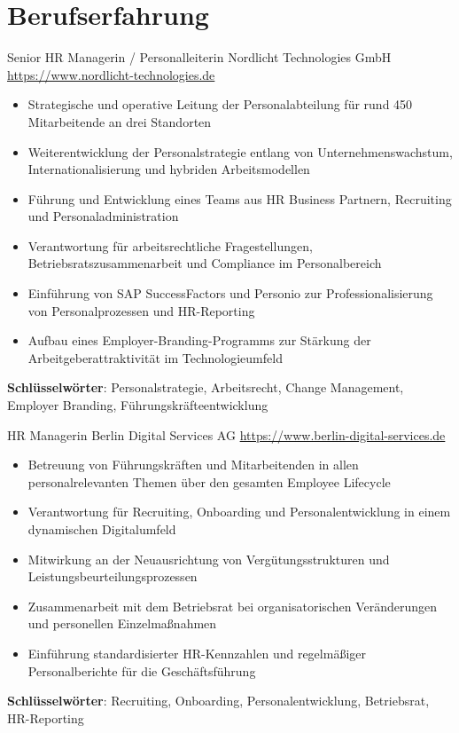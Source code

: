\documentclass[a4paper, serif, 10pt]{moderncv}
\begin{document}
\section{Berufserfahrung}

        {Senior HR Managerin / Personalleiterin}
        {Nordlicht Technologies GmbH}
        {\url{https://www.nordlicht-technologies.de}}
        {}
        {\begin{itemize}
\item Strategische und operative Leitung der Personalabteilung für rund 450 Mitarbeitende an drei Standorten
\item Weiterentwicklung der Personalstrategie entlang von Unternehmenswachstum, Internationalisierung und hybriden Arbeitsmodellen
\item Führung und Entwicklung eines Teams aus HR Business Partnern, Recruiting und Personaladministration
\item Verantwortung für arbeitsrechtliche Fragestellungen, Betriebsratszusammenarbeit und Compliance im Personalbereich
\item Einführung von SAP SuccessFactors und Personio zur Professionalisierung von Personalprozessen und HR-Reporting
\item Aufbau eines Employer-Branding-Programms zur Stärkung der Arbeitgeberattraktivität im Technologieumfeld
\end{itemize}
\textbf{Schlüsselwörter}: Personalstrategie, Arbeitsrecht, Change Management, Employer Branding, Führungskräfteentwicklung}

        {HR Managerin}
        {Berlin Digital Services AG}
        {\url{https://www.berlin-digital-services.de}}
        {}
        {\begin{itemize}
\item Betreuung von Führungskräften und Mitarbeitenden in allen personalrelevanten Themen über den gesamten Employee Lifecycle
\item Verantwortung für Recruiting, Onboarding und Personalentwicklung in einem dynamischen Digitalumfeld
\item Mitwirkung an der Neuausrichtung von Vergütungsstrukturen und Leistungsbeurteilungsprozessen
\item Zusammenarbeit mit dem Betriebsrat bei organisatorischen Veränderungen und personellen Einzelmaßnahmen
\item Einführung standardisierter HR-Kennzahlen und regelmäßiger Personalberichte für die Geschäftsführung
\end{itemize}
\textbf{Schlüsselwörter}: Recruiting, Onboarding, Personalentwicklung, Betriebsrat, HR-Reporting}
\end{document}
